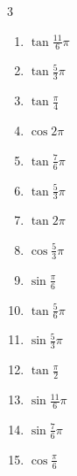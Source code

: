 \begin{multicols}{3}
\begin{enumerate}
  \item $\displaystyle \tan{\frac{11}{6}\pi}$

  \item $\displaystyle \tan{\frac{5}{3}\pi}$

  \item $\displaystyle \tan{\frac{\pi}{4}}$
        \phantom{$\displaystyle =1$}

  \item $\displaystyle \cos{2\pi}$
        \phantom{$\displaystyle =1$}

  \item $\displaystyle \tan{\frac{7}{6}\pi}$

  \item $\displaystyle \tan{\frac{5}{3}\pi}$

  \item $\displaystyle \tan{2\pi}$
        \phantom{$\displaystyle =0$}

  \item $\displaystyle \cos{\frac{5}{3}\pi}$

  \item $\displaystyle \sin{\frac{\pi}{6}}$

  \item $\displaystyle \tan{\frac{5}{6}\pi}$

  \item $\displaystyle \sin{\frac{5}{3}\pi}$

  \item $\displaystyle \tan{\frac{\pi}{2}}$
        \phantom{$\displaystyle \quad なし$}

  \item $\displaystyle \sin{\frac{11}{6}\pi}$

  \item $\displaystyle \sin{\frac{7}{6}\pi}$

  \item $\displaystyle \cos{\frac{\pi}{6}}$

\columnbreak %


\end{enumerate}
\end{multicols}
